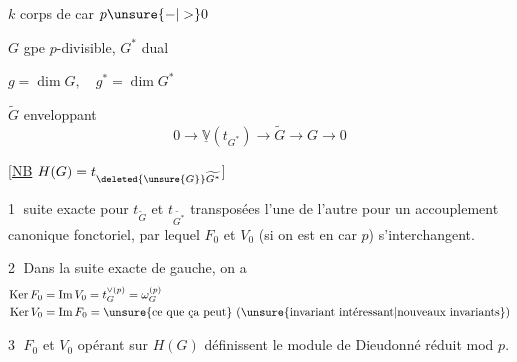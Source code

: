 $k$ corps de car $p\unsure{\mathord{-}|>}0$

$G$ gpe $p$-divisible, $G^{*}$ dual

$g=\dim G,\quad g^{*}=\dim G^{*}$

$\widetilde G$  enveloppant
\[
0\longrightarrow\underline{\mathbb V}(t_{G^{*}})\longrightarrow\widetilde G\longrightarrow G\longrightarrow0
\]


[\uline{NB} $H(G)=t_{\deleted{\unsure{G}}\widetilde{G^{*}}}$]

\textcircled{1} suite exacte pour $t_{\widetilde G}$ et $t_{\widetilde{G^{*}}}$ transposées l'une de l'autre pour un accouplement canonique fonctoriel,  par lequel $F_0$ et $V_0$ (si on est en car $p$) s'interchangent.

\textcircled{2} Dans la suite exacte de gauche, on a
\[
\begin{aligned}
\operatorname{Ker} F_0&=\operatorname{Im} V_0=t_G^{\vee(p)}=\omega_G^{(p)}\\
\operatorname{Ker} V_0&=\operatorname{Im} F_0=\text{\unsure{ce que ça peut} (\unsure{invariant intéressant|nouveaux invariants})}
\end{aligned}
\]

\textcircled{3} $F_0$ et $V_0$ opérant sur $H(G)$ définissent le module de Dieudonné  réduit mod $p$.

